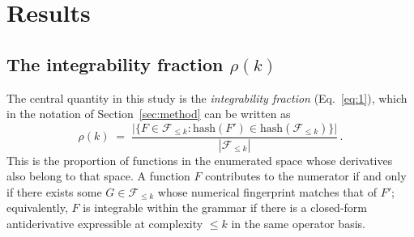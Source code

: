 \documentclass[preprint,12pt,authoryear]{elsarticle}
\newcommand{\Fleq}{\mathcal{F}_{\leq k}}
\newcommand{\rhok}{\rho(k)}
\newcommand{\hd}[1]{{\color{red}\textbf{[HD: #1]}}}
\begin{document}
\section{Results}
\label{sec:results}

\subsection{The integrability fraction $\rhok$}
\label{sec:rho}

The central quantity in this study is the \emph{integrability fraction} (Eq.~\ref{eq:1}), which in the notation of Section~\ref{sec:method} can be written as
\begin{equation}
\label{eq:rho}
\rhok \;=\; \frac{\bigl|\bigl\{F \in \Fleq : \mathrm{hash}(F') \in \mathrm{hash}(\Fleq)\bigr\}\bigr|}{|\Fleq|}\,.
\end{equation}
This is the proportion of functions in the enumerated space whose derivatives also belong to that space.
A function $F$ contributes to the numerator if and only if there exists some $G \in \Fleq$ whose numerical fingerprint matches that of $F'$; equivalently, $F$ is integrable within the grammar if there is a closed-form antiderivative expressible at complexity $\leq k$ in the same operator basis.

\end{document}
